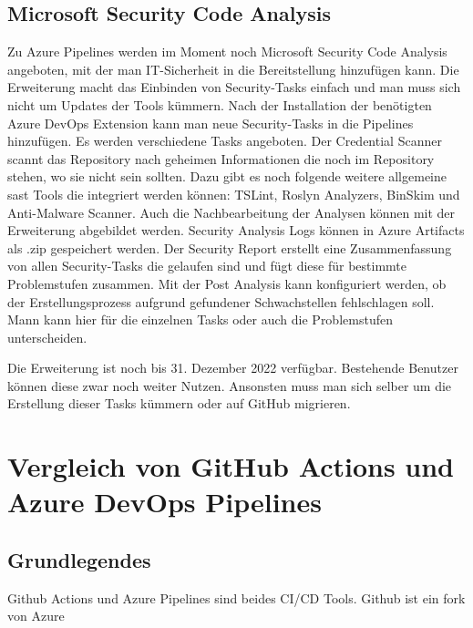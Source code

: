 \section{Microsoft Security Code Analysis}
Zu Azure Pipelines werden im Moment noch Microsoft Security Code Analysis angeboten, mit der man IT-Sicherheit in die Bereitstellung hinzufügen kann.
Die Erweiterung macht das Einbinden von Security-Tasks einfach und man muss sich nicht um Updates der Tools kümmern. Nach der Installation der benötigten Azure DevOps Extension kann man neue Security-Tasks in die Pipelines hinzufügen. \cite{mic-msca-install}
Es werden verschiedene Tasks angeboten. Der Credential Scanner scannt das Repository nach geheimen Informationen die noch im Repository stehen, wo sie nicht sein sollten. Dazu gibt es noch folgende weitere allgemeine \ac{sast} Tools die integriert werden können: TSLint, Roslyn Analyzers, BinSkim und Anti-Malware Scanner.
Auch die Nachbearbeitung der Analysen können mit der Erweiterung abgebildet werden. Security Analysis Logs können in Azure Artifacts als .zip gespeichert werden. Der Security Report erstellt eine Zusammenfassung von allen Security-Tasks die gelaufen sind und fügt diese für bestimmte Problemstufen zusammen. Mit der Post Analysis kann konfiguriert werden, ob der Erstellungsprozess aufgrund gefundener Schwachstellen fehlschlagen soll. Mann kann hier für die einzelnen Tasks oder auch die Problemstufen unterscheiden. \cite{mic-msca-generall}

Die Erweiterung ist noch bis 31. Dezember 2022 verfügbar. Bestehende Benutzer können diese zwar noch weiter Nutzen. Ansonsten muss man sich selber um die Erstellung dieser Tasks kümmern oder auf GitHub migrieren. \cite{mic-msca-generall}

\chapter{Vergleich von GitHub Actions und Azure DevOps Pipelines}
\section{Grundlegendes}

Github Actions und Azure Pipelines sind beides CI/CD Tools. Github ist ein fork von Azure

